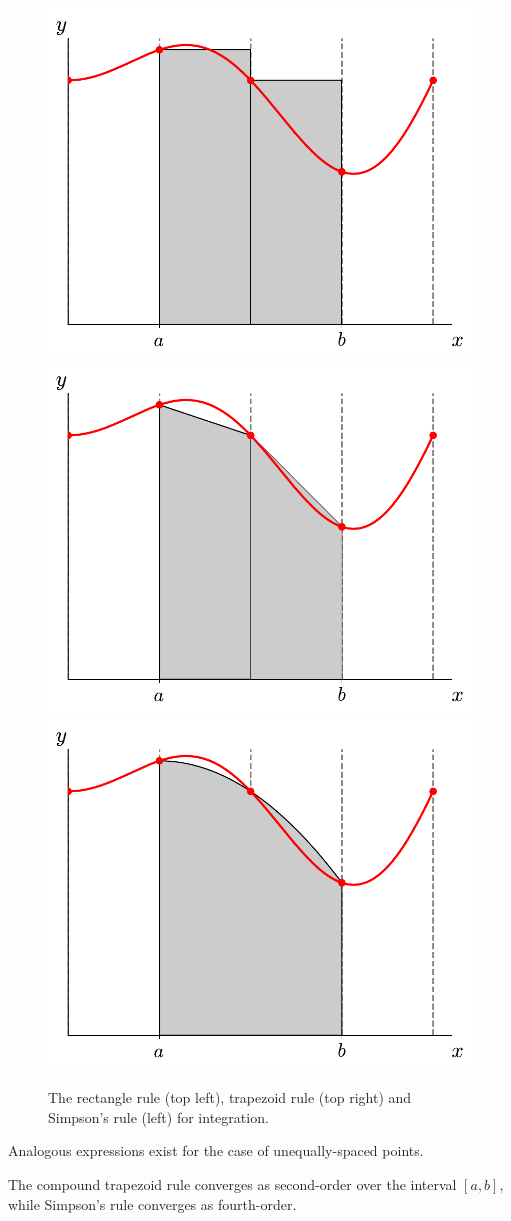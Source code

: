 \begin{figure}
\centering
\includegraphics[width=0.49\linewidth]{rectangle}
\includegraphics[width=0.49\linewidth]{trapezoid} \\
\includegraphics[width=0.49\linewidth]{simpsons}
\begin{minipage}[b]{0.49\linewidth}
\caption[Integration rules]{\label{fig:integration} The rectangle rule
  (top left), trapezoid rule (top right) and Simpson's rule (left) for
  integration.}
\end{minipage}
\end{figure}


Analogous expressions exist for the case of unequally-spaced points.

The compound trapezoid rule converges as second-order over the
interval $[a,b]$, while Simpson's rule converges as fourth-order.


